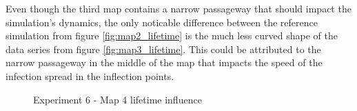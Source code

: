Even though the third map contains a narrow passageway that should impact the simulation's dynamics, the only noticable difference between the reference simulation from figure \ref{fig:map2_lifetime} is the much less curved shape of the data series from figure \ref{fig:map3_lifetime}.
This could be attributed to the narrow passageway in the middle of the map that impacts the speed of the infection spread in the inflection points.

\begin{figure}[H]
    \centering

    \hspace*{\fill}

    \hspace*{\fill}

    \caption{Experiment 6 - Map 4 lifetime influence}\label{fig:map4_lifetime}
\end{figure}

